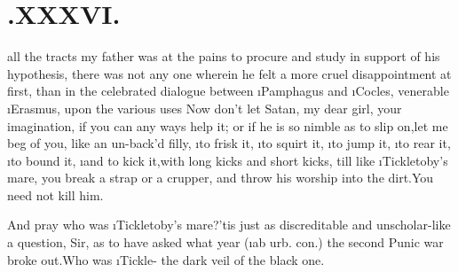 \documentclass[twoside]{article}
\begin{document}
\section{.\quad  XXXVI.}

 all the tracts my father was at
the pains to procure and study in support of his hypothesis, there
was not any one wherein he felt a more cruel disappointment at
first, than in the celebrated dialogue between \i{Pamphagus} and
\i{Cocles}, 
venerable \i{Erasmus}, upon the various uses
\tsh Now don’t let Satan, my dear girl, 
your imagination, if you can any ways help it; or if he is so
nimble as to slip on,\tsh let me beg of you, like an un-\break back’d
filly, \i{to frisk it}, 
\i{to squirt it}, 
\i{to jump it}, 
\i{to rear it}, 
\i{to bound it},\tsh 
\i{and to kick it,\break with long kicks and short
kicks}, till like \i{Tickletoby}’s mare, you break a
strap\break
or a crupper, and throw his worship\break
into the dirt.\tsh You need not kill\break
him.\tsh

\tsk And pray who was \i{Tickletoby}’s
mare?\tsk ’tis just as discreditable and un\-scholar-like a
question, Sir, as to have asked what year (\i{ab urb.\@
con.})\@
the second Punic war broke out.\tsk Who was
\i{Tickle-}
the dark veil of the black one.
\end{document}
